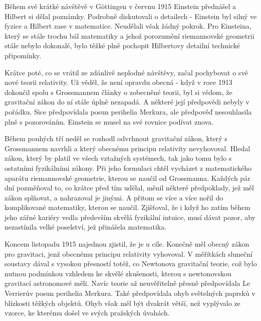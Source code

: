   Během své krátké návštěvě v Göttingen v červnu 1915 Einstein přednášel a Hilbert si dělal
  poznámky. Podrobně diskutovali o detailech - Einstein byl silný ve fyzice a Hilbert zase v
  matematice. Neudělali však žádný pokrok. Pro Einsteina, který se stále trochu bál matematiky a
  jehož porozumění riemannovské geometrii stále nebylo dokonalé, bylo těžké plně pochopit Hilbertovy
  detailní technické připomínky. 
  
  Krátce poté, co se vrátil ze zdánlivě neplodné návštěvy, začal pochybovat o své nové teorii
  relativity. Už věděl, že není opravdu obecná - když v roce 1913 dokončil spolu s Grossmannem
  články o zobecněné teorii, byl si vědom, že gravitační zákon do ní stále úplně nezapadá. A některé
  její předpovědi nebyly v pořádku. Sice předpovídala posun perihelia Merkura, ale předpověď
  nesouhlasila plně s pozorováním. Einstein se musel na své rovnice podívat znova. 
  
  Během pouhých tří neděl se rozhodl odvrhnout gravitační zákon, který s Grossmannem navrhli a který
  obecnému principu relativity nevyhovoval. Hledal zákon, který by platil ve všech vztažných
  systémech, tak jako tomu bylo s ostatními fyzikálními zákony. Při jeho formulaci chtěl vycházet z
  matematického aparátu riemannovské geometrie, kterou se naučil od Grossmanna. Každých pár dní
  pozměňoval to, co krátce před tím udělal, měnil některé předpoklady, jež měl zákon splňovat, a
  nahrazoval je jinými. A přitom se více a více nořil do komplikované matematiky, kterou se naučil.
  Zjišťoval, že i když ho zatím během jeho zářné kariéry vedla především skvělá fyzikální intuice,
  musí dávat pozor, aby nezastínila velké poselství, jež přinášela matematika. 
  
  Koncem listopadu 1915 najednou zjistil, že je u cíle. Konečně měl obecný zákon pro gravitaci, jenž
  obecnému principu relativity vyhovoval. V měřítkách sluneční soustavy dával s vysokou přesností
  totéž, co Newtonova gravitační teorie, což bylo nutnou podmínkou vzhledem ke skvělé zkušenosti,
  kterou s newtonovskou gravitací astronomové měli. Navíc teorie až neuvěřitelně přesně předpovídala
  Le Verrierův posun perihelia Merkura. Také předpovídala ohyb světelných paprsků v blízkosti
  těžkých objektů. Ohyb však měl být dvakrát větší, než vyplývalo ze vzorce, ke kterému došel ve
  svých pražských úvahách. 
  
